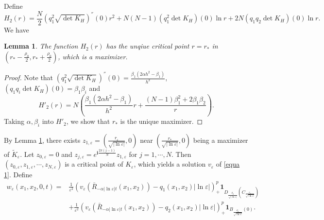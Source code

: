 \documentclass[12pt,reqno]{amsart}
\numberwithin{equation}{section}
\newtheorem{lemma}[theorem]{Lemma}
\theoremstyle{definition}
\theoremstyle{remark}
\begin{document}
Define 
$$H_2(r)=\frac{N}{2} \left(q_1^2\sqrt{\det K_H} \right)^{''}(0 )r^2+N(N-1)\left( q_1^2  \det K_H\right)(0)\ln r+2N\left( q_1q_2 \det K_H\right)(0)\ln r.$$
We have
\begin{lemma}\label{lm702}
	The function 
	$ H_2(r) $
	has the unqiue critical point $ r=r_* $ in $  \left (r_*-\frac{\rho_0}{2},r_*+\frac{\rho_0}{2} \right ) $, which is a maximizer.
\end{lemma}  
\begin{proof}
Note that $  \left(q_1^2\sqrt{\det K_H} \right)^{''}(0 )=\frac{\beta_1(2\alpha h^2-\beta_1)}{h^2} $, $ \left( q_1q_i \det K_H\right)(0)=\beta_1\beta_i $ and $$ H'_2(r)=N\left(\frac{\beta_1(2\alpha h^2-\beta_1)}{h^2} r+\frac{(N-1)\beta_1^2+2\beta_1\beta_2}{r} \right).  $$ Taking $ \alpha,\beta_i $ into $ H'_2 $, we show that $ r_* $ is the unique maximizer.
\end{proof}
%
By Lemma \ref{lm702}, there exists $ z_{1,\varepsilon}=\left( \frac{r_\varepsilon}{\sqrt{|\ln\varepsilon|}},0\right)  $ near $ \left( \frac{r_*}{\sqrt{|\ln\varepsilon|}},0\right) $ being  a maximizer of $ \tilde{K}_\varepsilon  $. Let $ z_{0,\varepsilon}=0 $ and $ z_{j,\varepsilon}=e^{\textbf{i}\frac{2\pi(j-1)}{N}}z_{1,\varepsilon} $ for $ j=1,\cdots,N. $ Then $ \left( z_{0,\varepsilon},z_{1,\varepsilon},\cdots,z_{N,\varepsilon} \right)  $ is a critical point  of $ K_\varepsilon  $, which yields a solution $ v_\varepsilon $ of \eqref{equa 1}. Define 
\begin{equation*} 
\begin{split}
w_\varepsilon(x_1,x_2,0,t)=&\frac{1}{\varepsilon^2}\left (v_\varepsilon\left(\bar{R}_{-\alpha|\ln\varepsilon| t}(x_1,x_2) \right) -q_1(x_1,x_2)|\ln\varepsilon| \right )^{p}_+\textbf{1}_{D_{\frac{\rho_0}{\sqrt{|\ln\varepsilon|}}}\left (C_{\frac{r_*}{\sqrt{|\ln\varepsilon|}}}\right )}\\
&+\frac{1}{\varepsilon^2}\left (v_\varepsilon\left(\bar{R}_{-\alpha|\ln\varepsilon| t}(x_1,x_2) \right)-q_2(x_1,x_2)|\ln\varepsilon| \right )^{p}_+\textbf{1}_{B_{\frac{\rho_0}{\sqrt{|\ln\varepsilon|}}}\left (0\right )}.
\end{split}
\end{equation*}
\end{document}

